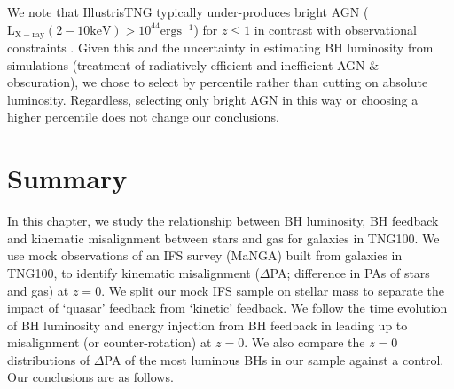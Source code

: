 We note that IllustrisTNG typically under-produces bright AGN ($\mathrm{L_{X-ray}(2-10 keV) > 10^{44}ergs^{-1}}$) for $z \leq 1$ in contrast with observational constraints \citep[see][]{habouzit2019}. Given this and the uncertainty in estimating BH luminosity from simulations (treatment of radiatively efficient and inefficient AGN \& obscuration), we chose to select by percentile rather than cutting on absolute luminosity. Regardless, selecting only bright AGN in this way or choosing a higher percentile does not change our conclusions.

\section{Summary} \label{sec:summary_BH}
In this chapter, we study the relationship between BH luminosity, BH feedback and kinematic misalignment between stars and gas for galaxies in TNG100. We use mock observations of an IFS survey (MaNGA) built from galaxies in TNG100, to identify kinematic misalignment ($\Delta$PA; difference in PAs of stars and gas) at $z=0$. We split our mock IFS sample on stellar mass to separate the impact of `quasar' feedback from `kinetic' feedback. We follow the time evolution of BH luminosity and energy injection from BH feedback in leading up to misalignment (or counter-rotation) at $z=0$. We also compare the $z=0$ distributions of $\Delta$PA of the most luminous BHs in our sample against a control. Our conclusions are as follows.
